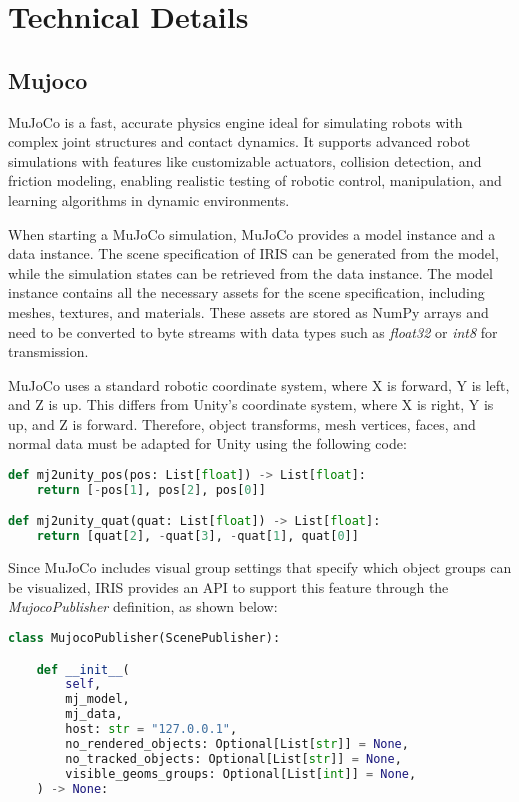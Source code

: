 \section{Technical Details}

\subsection{Mujoco}
\label{app:mujoco}

MuJoCo \cite{todorov2012mujoco} is a fast, accurate physics engine ideal for simulating robots with complex joint structures and contact dynamics.
It supports advanced robot simulations with features like customizable actuators, collision detection, and friction modeling, enabling realistic testing of robotic control, manipulation, and learning algorithms in dynamic environments.

When starting a MuJoCo simulation, MuJoCo provides a model instance and a data instance.
The scene specification of IRIS can be generated from the model, while the simulation states can be retrieved from the data instance.
The model instance contains all the necessary assets for the scene specification, including meshes, textures, and materials. 
These assets are stored as NumPy arrays and need to be converted to byte streams with data types such as \textit{float32} or \textit{int8} for transmission.

MuJoCo uses a standard robotic coordinate system, where X is forward, Y is left, and Z is up. This differs from Unity's coordinate system, where X is right, Y is up, and Z is forward.
Therefore, object transforms, mesh vertices, faces, and normal data must be adapted for Unity using the following code:

\begin{lstlisting}[language=Python]
def mj2unity_pos(pos: List[float]) -> List[float]:
    return [-pos[1], pos[2], pos[0]]

def mj2unity_quat(quat: List[float]) -> List[float]:
    return [quat[2], -quat[3], -quat[1], quat[0]]
\end{lstlisting}

Since MuJoCo includes visual group settings that specify which object groups can be visualized, IRIS provides an API to support this feature through the \textit{MujocoPublisher} definition, as shown below:

\begin{lstlisting}[language=Python]
class MujocoPublisher(ScenePublisher):

    def __init__(
        self,
        mj_model,
        mj_data,
        host: str = "127.0.0.1",
        no_rendered_objects: Optional[List[str]] = None,
        no_tracked_objects: Optional[List[str]] = None,
        visible_geoms_groups: Optional[List[int]] = None,
    ) -> None:
\end{lstlisting}

